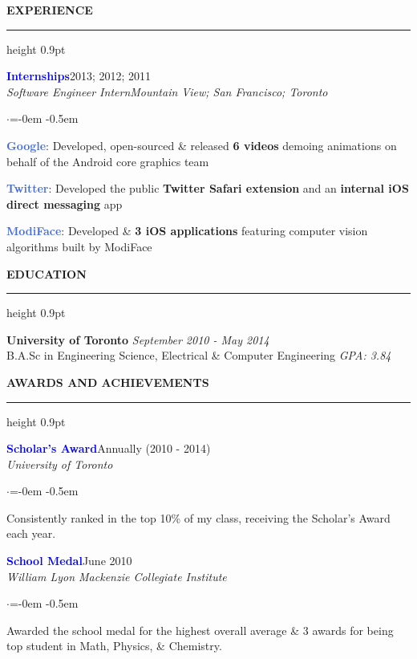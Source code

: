 \documentclass[
    11pt, %
]{resume} %
\newenvironment{rSectionCustom}[1]{
  \Large
  \sectionskip
  \textbf{\textcolor{Cerulean}{\MakeUppercase{#1}}}
  \vspace{0.5em}
  {\color{Blue}\hrule height 0.9pt}
  \vspace{0.25em}

  \begin{list}{}{
    \setlength{\leftmargin}{1.5em}
  }
  \item[]
}{
    \vspace{1em}
    \end{list}
}
\newenvironment{rSubsection2}[4]{
  \normalsize
  \hspace{-18pt}\textcolor{Blue}{\textbf{\large #1}}\hfill{#2}
  \\
  \hspace*{-18pt}\emph{#3}\hfill\emph{#4}
  \begin{list}{$\cdot$}{\leftmargin=-0em}
  \itemsep -0.5em \vspace{-0.25em}
}{
    \vspace{1em}
    \end{list}
}
\begin{document}
\begin{rSectionCustom}{Experience}
    \begin{rSubsection2}{Internships}{2013; 2012; 2011}{Software Engineer Intern}{Mountain View; San Francisco; Toronto}
        \item[] \textcolor{RoyalBlue}{\textbf{Google}}: Developed, open-sourced \& released \textbf{6 videos} demoing animations on behalf of the Android core graphics team
        \item[] \textcolor{RoyalBlue}{\textbf{Twitter}}: Developed the public \textbf{Twitter Safari extension} and an \textbf{internal iOS direct messaging}  app
        \item[] \textcolor{RoyalBlue}{\textbf{ModiFace}}: Developed & \released \textbf{3 iOS applications} featuring computer vision algorithms built by ModiFace
    \end{rSubsection2}



\end{rSectionCustom}

\vspace{-1.5em}


\begin{rSectionCustom}{Education}
    \normalsize\textbf{University of Toronto} \hfill \textit{September 2010 - May 2014} \\
        B.A.Sc in Engineering Science, Electrical \& Computer Engineering \hfill \emph{GPA: 3.84}
\end{rSectionCustom}



\begin{rSectionCustom}{Awards and Achievements}
    \begin{rSubsection2}{Scholar's Award}{Annually (2010 - 2014)}{University of Toronto}{}
        \item[] Consistently ranked in the top 10\% of my class, receiving the Scholar's Award each year.
    \end{rSubsection2}
    \begin{rSubsection2}{School Medal}{June 2010}{William Lyon Mackenzie Collegiate Institute}{}
        \item[] Awarded the school medal for the highest overall  average \& 3 awards for being top student in Math, Physics, \& Chemistry.
    \end{rSubsection2}
\end{rSectionCustom}
\end{document}
